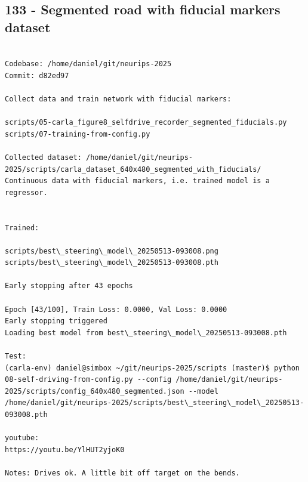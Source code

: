 
\subsection{133 - Segmented road with fiducial markers dataset}
\label{app_res:133}

\begin{verbatim}

Codebase: /home/daniel/git/neurips-2025
Commit: d82ed97

Collect data and train network with fiducial markers:

scripts/05-carla_figure8_selfdrive_recorder_segmented_fiducials.py
scripts/07-training-from-config.py

Collected dataset: /home/daniel/git/neurips-2025/scripts/carla_dataset_640x480_segmented_with_fiducials/
Continuous data with fiducial markers, i.e. trained model is a regressor.


Trained:

scripts/best\_steering\_model\_20250513-093008.png
scripts/best\_steering\_model\_20250513-093008.pth

Early stopping after 43 epochs

Epoch [43/100], Train Loss: 0.0000, Val Loss: 0.0000
Early stopping triggered
Loading best model from best\_steering\_model\_20250513-093008.pth

Test:
(carla-env) daniel@simbox ~/git/neurips-2025/scripts (master)$ python 08-self-driving-from-config.py --config /home/daniel/git/neurips-2025/scripts/config_640x480_segmented.json --model /home/daniel/git/neurips-2025/scripts/best\_steering\_model\_20250513-093008.pth

youtube:
https://youtu.be/YlHUT2yjoK0

Notes: Drives ok. A little bit off target on the bends.


\end{verbatim}

